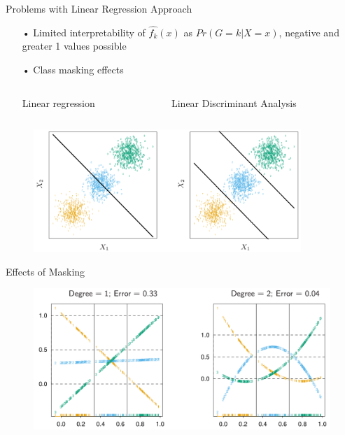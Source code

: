 \documentclass{beamer}
\begin{document}
\begin{frame}{Problems with Linear Regression Approach}
\begin{itemize}
\item[•] Limited interpretability of $\hat{f_k}(x)$ as $Pr(G=k|X=x)$, negative and greater 1 values possible
\item[•] Class masking effects

\vspace{0.8cm}


\begin{columns}
\begin{column}{0.5\textwidth}
\begin{center}
Linear regression
\end{center}
\end{column}
\begin{column}{0.5\textwidth}
\begin{center}
Linear Discriminant Analysis
\end{center}
\end{column}
\end{columns}
\end{itemize}
\begin{figure}
\begin{flushleft}
\includegraphics[width=0.9\textwidth]{Masking1.png}
\end{flushleft}
\end{figure}
\end{frame}

\begin{frame}{Effects of Masking}
\begin{figure}
\centering
\includegraphics[width=\textwidth]{Masking2.png}
\end{figure}
\end{frame}
\end{document}

